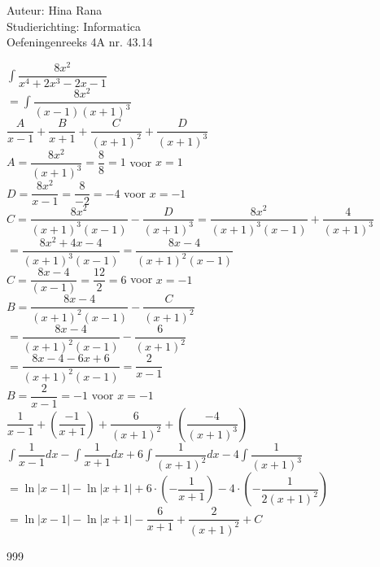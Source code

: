 \documentclass[a4paper]{article}
\newcommand{\dint}{\displaystyle\int}
\begin{document}
\noindent \large Auteur: Hina Rana \\
\noindent \large Studierichting: Informatica\\
\noindent \large Oefeningenreeks 4A nr. 43.14\\

\medskip

\normalsize

$ \dint \dfrac{8x^2}{x^4+2x^3-2x-1}$\\

$  = \dint \dfrac{8x^2}{(x-1)(x+1)^3}$\\

$ \dfrac{A}{x-1} + \dfrac{B}{x+1} + \dfrac{C}{(x+1)^2} + \dfrac{D}{(x+1)^3}$ \\

$ A = \dfrac{8x^2}{(x+1)^3} = \dfrac{8}{8} = 1 $ voor $x=1$ \\

$ D = \dfrac{8x^2}{x-1} = \dfrac{8}{-2} = -4$ voor $x = -1$ \\

$ C = \dfrac{8x^2}{(x+1)^3(x-1)} - \dfrac{D}{(x+1)^3} = \dfrac{8x^2}{(x+1)^3(x-1)} + \dfrac{4}{(x+1)^3}$ \\

$  = \dfrac{8x^2 + 4x - 4}{(x+1)^3(x-1)} = \dfrac{8x-4}{(x+1)^2(x-1)}$ \\

$ C = \dfrac{8x-4}{(x-1)} = \dfrac{12}{2} = 6 $ voor $x= -1$ \\

$ B = \dfrac{8x-4}{(x+1)^2(x-1)} - \dfrac{C}{(x+1)^2}$ \\

$ = \dfrac{8x-4}{(x+1)^2 (x-1)} - \dfrac{6}{(x+1)^2}$ \\

$ = \dfrac{8x-4-6x+6}{(x+1)^2(x-1)} = \dfrac{2}{x-1}$ \\

$ B = \dfrac{2}{x-1} = -1$ voor $x = -1$ \\

$ \dfrac{1}{x-1} + \left(\dfrac{-1}{x+1}\right) + \dfrac{6}{(x+1)^2} + \left(\dfrac{-4}{(x+1)^3}\right)$ \\

$ \dint\dfrac{1}{x-1}dx -\dint\dfrac{1}{x+1}dx + 6 \dint\dfrac{1}{(x+1)^2}dx - 4\dint\dfrac{1}{(x+1)^3}$ \\

$ = \ln|x-1| - \ln|x+1| + 6 \cdot \left(-\dfrac{1}{x+1}\right) - 4 \cdot \left(-\dfrac{1}{2(x+1)^2}\right)$\\

$ = \ln|x-1| - \ln|x+1| - \dfrac{6}{x+1} + \dfrac{2}{(x+1)^2} + C $ \\

\begin{thebibliography}{999}
\end{thebibliography}
\end{document}
